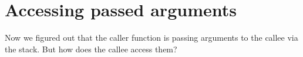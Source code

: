 \section{Accessing passed arguments}
\myindex{\Stack}

Now we figured out that the \gls{caller} function is passing arguments to the \gls{callee} via the stack. 
But how does the \gls{callee} access them?








